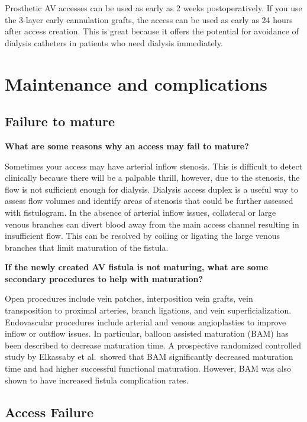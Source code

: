 \documentclass[
]{book}
\begin{document}
Prosthetic AV accesses can be used as early as 2 weeks postoperatively.
If you use the 3-layer early cannulation grafts, the access can be used
as early as 24 hours after access creation. This is great because it
offers the potential for avoidance of dialysis catheters in patients who
need dialysis immediately.\citep{glickman2015}

\hypertarget{maintenance-and-complications}{%
\section{Maintenance and complications}\label{maintenance-and-complications}}

\hypertarget{failure-to-mature}{%
\subsection{Failure to mature}\label{failure-to-mature}}

\textbf{What are some reasons why an access may fail to mature?}

Sometimes your access may have arterial inflow stenosis. This is
difficult to detect clinically because there will be a palpable thrill,
however, due to the stenosis, the flow is not sufficient enough for
dialysis. Dialysis access duplex is a useful way to assess flow volumes
and identify areas of stenosis that could be further assessed with
fistulogram. In the absence of arterial inflow issues, collateral or
large venous branches can divert blood away from the main access channel
resulting in insufficient flow. This can be resolved by coiling or
ligating the large venous branches that limit maturation of the fistula.

\textbf{If the newly created AV fistula is not maturing, what are some
secondary procedures to help with maturation?}

Open procedures include vein patches, interposition vein grafts, vein
transposition to proximal arteries, branch ligations, and vein
superficialization. Endovascular procedures include arterial and venous
angioplasties to improve inflow or outflow issues.\citep{sidawy2008} In
particular, balloon assisted maturation (BAM) has been described to
decrease maturation time. A prospective randomized controlled study by
Elkassaby et al.~showed that BAM significantly decreased maturation time
and had higher successful functional maturation. However, BAM was also
shown to have increased fistula complication rates.\citep{elkassaby2021}

\hypertarget{access-failure}{%
\subsection{Access Failure}\label{access-failure}}
\end{document}

